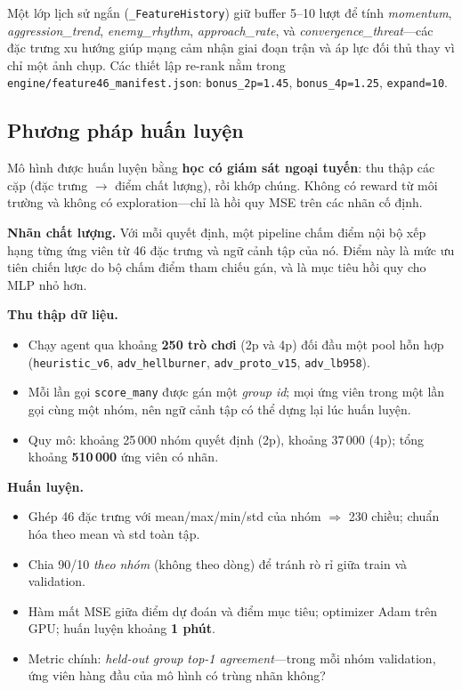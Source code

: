 \documentclass[conference]{IEEEtran}
\begin{document}
Một lớp lịch sử ngắn (\texttt{\_FeatureHistory}) giữ buffer 5--10 lượt để tính \textit{momentum}, \textit{aggression\_trend}, \textit{enemy\_rhythm}, \textit{approach\_rate}, và \textit{convergence\_threat}---các đặc trưng xu hướng giúp mạng cảm nhận giai đoạn trận và áp lực đối thủ thay vì chỉ một ảnh chụp. Các thiết lập re-rank nằm trong \texttt{engine/feature46\_manifest.json}: \texttt{bonus\_2p=1.45}, \texttt{bonus\_4p=1.25}, \texttt{expand=10}.

\subsection{Phương pháp huấn luyện}
\label{sec:training}

Mô hình được huấn luyện bằng \textbf{học có giám sát ngoại tuyến}: thu thập các cặp (đặc trưng $\rightarrow$ điểm chất lượng), rồi khớp chúng. Không có reward từ môi trường và không có exploration---chỉ là hồi quy MSE trên các nhãn cố định.

\textbf{Nhãn chất lượng.} Với mỗi quyết định, một pipeline chấm điểm nội bộ xếp hạng từng ứng viên từ 46 đặc trưng và ngữ cảnh tập của nó. Điểm này là mức ưu tiên chiến lược do bộ chấm điểm tham chiếu gán, và là mục tiêu hồi quy cho MLP nhỏ hơn.

\textbf{Thu thập dữ liệu.}
\begin{itemize}
\item Chạy agent qua khoảng \textbf{250 trò chơi} (2p và 4p) đối đầu một pool hỗn hợp (\texttt{heuristic\_v6}, \texttt{adv\_hellburner}, \texttt{adv\_proto\_v15}, \texttt{adv\_lb958}).
\item Mỗi lần gọi \texttt{score\_many} được gán một \textit{group id}; mọi ứng viên trong một lần gọi cùng một nhóm, nên ngữ cảnh tập có thể dựng lại lúc huấn luyện.
\item Quy mô: khoảng 25\,000 nhóm quyết định (2p), khoảng 37\,000 (4p); tổng khoảng \textbf{510\,000} ứng viên có nhãn.
\end{itemize}

\textbf{Huấn luyện.}
\begin{itemize}
\item Ghép 46 đặc trưng với mean/max/min/std của nhóm $\Rightarrow$ 230 chiều; chuẩn hóa theo mean và std toàn tập.
\item Chia 90/10 \textit{theo nhóm} (không theo dòng) để tránh rò rỉ giữa train và validation.
\item Hàm mất MSE giữa điểm dự đoán và điểm mục tiêu; optimizer Adam trên GPU; huấn luyện khoảng \textbf{1 phút}.
\item Metric chính: \textit{held-out group top-1 agreement}---trong mỗi nhóm validation, ứng viên hàng đầu của mô hình có trùng nhãn không?
\end{itemize}
\end{document}
